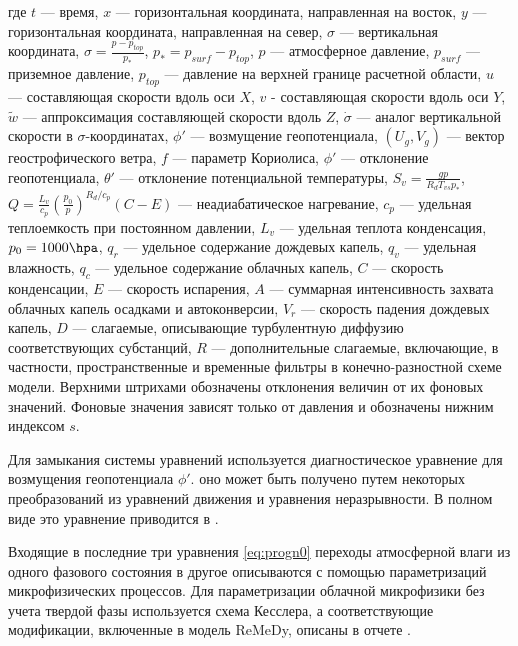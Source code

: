 где $t$ --- время, $x$ --- горизонтальная координата, направленная на восток, $y$ --- горизонтальная координата, направленная на север, $\sigma$ --- вертикальная координата, $\sigma=\frac{p-p_{top}}{p_*}$, $p_*=p_{surf}-p_{top}$, $p$ --- атмосферное давление, $p_{surf}$ --- приземное давление, $p_{top}$ --- давление на верхней границе расчетной области, $u$ --- составляющая скорости вдоль оси $X$, $v$ - составляющая скорости вдоль оси $Y$, $\tilde{w}$ --- аппроксимация составляющей скорости вдоль $Z$, $\dot{\sigma}$ --- аналог вертикальной скорости в $\sigma$-координатах, $\phi'$ --- возмущение геопотенциала, $(U_g,V_g)$ --- вектор геострофического ветра, $f$ --- параметр Кориолиса, $\phi'$ --- отклонение геопотенциала, $\theta'$ --- отклонение потенциальной температуры, $S_v=\frac{gp}{R_dT_{vs}p_*}$, $Q=\frac{L_v}{c_p}\left(\frac{p_0}{p}\right)^{R_d/c_p}(C-E)$ --- неадиабатическое нагревание, $c_p$ --- удельная теплоемкость при постоянном давлении, $L_v$ --- удельная теплота конденсация, $p_0=1000\hpa$, $q_r$ --- удельное содержание дождевых капель, $q_v$ --- удельная влажность, $q_c$ --- удельное содержание облачных капель, $C$ --- скорость конденсации, $E$ --- скорость испарения, $A$ --- суммарная интенсивность захвата облачных капель осадками и автоконверсии, $V_r$ --- скорость падения дождевых капель, $D$ --- слагаемые, описывающие турбулентную диффузию соответствующих субстанций, $R$ --- дополнительные слагаемые, включающие, в частности, пространственные и временные фильтры в конечно-разностной схеме модели. Верхними штрихами обозначены отклонения величин от их фоновых значений. Фоновые значения зависят только от давления и обозначены нижним индексом $s$.

Для замыкания системы уравнений используется диагностическое уравнение для возмущения геопотенциала $\phi'$. оно может быть получено путем некоторых преобразований из уравнений движения и уравнения неразрывности. В полном виде это уравнение приводится в \citep{MirandaPhD}.

Входящие в последние три уравнения \eqref{eq:progn0} переходы атмосферной влаги из одного фазового состояния в другое описываются с помощью параметризаций микрофизических процессов. Для параметризации облачной микрофизики без учета твердой фазы используется схема Кесслера, а соответствующие модификации, включенные в модель ReMeDy, описаны в отчете \citep{TeixeiraMiranda1997}.

